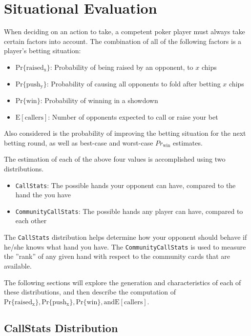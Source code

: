
\clearpage




\chapter{Situational Evaluation}
\label{sec:SituationalEvaluation}

When deciding on an action to take, a competent poker player must always take certain factors into account.
The combination of all of the following factors is a player's betting situation:
\begin{itemize}
\singlespacing
\item $\mathrm{Pr\{raised_x\}}$: Probability of being raised by an opponent, to $x$ chips
\item $\mathrm{Pr\{push_y\}}$: Probability of causing all opponents to fold after betting $x$ chips
\item $\mathrm{Pr\{win\}}$: Probability of winning in a showdown
\item $\mathrm{E[callers]}$: Number of opponents expected to call or raise your bet
\end{itemize}
Also considered is the probability of improving the betting situation for the next betting round, as well as best-case and worst-case $Pr_\mathrm{win}$ estimates.

The estimation of each of the above four values is accomplished using two distributions.
\begin{itemize}
\singlespacing
\item \texttt{CallStats}: The possible hands your opponent can have, compared to the hand the you have
\item \texttt{CommunityCallStats}: The possible hands any player can have, compared to each other
\end{itemize}
The \texttt{CallStats} distribution helps determine how your opponent should behave if he/she knows what hand you have.
The \texttt{CommunityCallStats} is used to measure the ''rank'' of any given hand with respect to the community cards that are available.

The following sections will explore the generation and characteristics of each of these distributions, and then describe the computation of $\mathrm{Pr\{raised_x\}, Pr\{push_x\}, Pr\{win\}, and E[callers]}$.


\section{CallStats Distribution}
\label{sec:CallStats}

